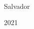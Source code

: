 \begin{folharosto}

\begin{center}
\theauthor \\
\end{center}
\ \\
\ \\
\ \\
\ \\
\ \\
\begin{spacing}{2}
   \begin{center}
   {\LARGE {\bf \thetitle}}
   \end{center}
\end{spacing}
\ \\
\ \\
\ \\
\vspace*{85mm}







\ \\
\ \\
\ \\
\ \\
   \begin{center}
   Salvador \par
   \theuniversity \par
   2021
   \end{center}

\end{folharosto}
